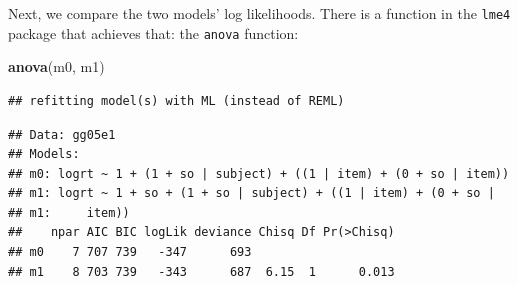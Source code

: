 \documentclass[12pt,]{krantz}
\newenvironment{Shaded}{\begin{snugshade}}{\end{snugshade}}
\newcommand{\DataTypeTok}[1]{\textcolor[rgb]{0.13,0.29,0.53}{#1}}
\newcommand{\DecValTok}[1]{\textcolor[rgb]{0.00,0.00,0.81}{#1}}
\newcommand{\KeywordTok}[1]{\textcolor[rgb]{0.13,0.29,0.53}{\textbf{#1}}}
\newcommand{\NormalTok}[1]{#1}
\newcommand{\OperatorTok}[1]{\textcolor[rgb]{0.81,0.36,0.00}{\textbf{#1}}}
\newcommand{\OtherTok}[1]{\textcolor[rgb]{0.56,0.35,0.01}{#1}}
\newcommand{\StringTok}[1]{\textcolor[rgb]{0.31,0.60,0.02}{#1}}
\begin{document}
\begin{Shaded}
\end{Shaded}

Next, we compare the two models' log likelihoods. There is a function in the \texttt{lme4} package that achieves that: the \texttt{anova} function:

\begin{Shaded}
\begin{Highlighting}[]
\KeywordTok{anova}\NormalTok{(m0, m1)}
\end{Highlighting}
\end{Shaded}

\begin{verbatim}
## refitting model(s) with ML (instead of REML)
\end{verbatim}

\begin{verbatim}
## Data: gg05e1
## Models:
## m0: logrt ~ 1 + (1 + so | subject) + ((1 | item) + (0 + so | item))
## m1: logrt ~ 1 + so + (1 + so | subject) + ((1 | item) + (0 + so | 
## m1:     item))
##    npar AIC BIC logLik deviance Chisq Df Pr(>Chisq)
## m0    7 707 739   -347      693                    
## m1    8 703 739   -343      687  6.15  1      0.013
\end{verbatim}
\end{document}
